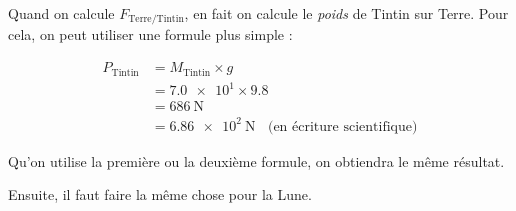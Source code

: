 \documentclass[../Cours.tex]{subfiles}
\begin{document}
\clearpage
Quand on calcule $F_{\mbox{Terre/Tintin}}$, en fait on calcule le \emph{poids} de Tintin sur Terre. Pour cela, on peut utiliser une formule plus simple : 

\begin{align*}
    P_{\mbox{Tintin}} &= M_{\mbox{Tintin}} \times g \\
    &= \num{7.0e1} \times \num{9.8} \\ 
    &= \qty{686}{\newton} \\
    &= \qty{6.86e2}{\newton} ~~~~\mbox{(en écriture scientifique)}
\end{align*}

Qu'on utilise la première ou la deuxième formule, on obtiendra le même résultat.

Ensuite, il faut faire la même chose pour la Lune.
\end{document}
